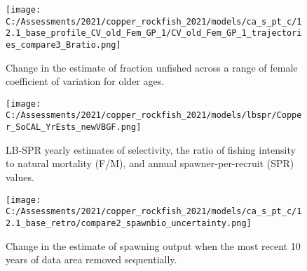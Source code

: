 \documentclass[11pt,
  english,
  a4paper,
]{article}
\begin{document}
\tagmcend\tagstructend


\begin{figure}
\centering
\texttt{[image: C:/Assessments/2021/copper\_rockfish\_2021/models/ca\_s\_pt\_c/12.1\_base\_profile\_CV\_old\_Fem\_GP\_1/CV\_old\_Fem\_GP\_1\_trajectories\_compare3\_Bratio.png]}
\caption{Change in the estimate of fraction unfished across a range of female coefficient of variation for older ages.\label{fig:cv-depl}}
\end{figure}

\tagmcend\tagstructend

\clearpage


\begin{figure}
\centering
\texttt{[image: C:/Assessments/2021/copper\_rockfish\_2021/models/lbspr/Copper\_SoCAL\_YrEsts\_newVBGF.png]}
\caption{LB-SPR yearly estimates of selectivity, the ratio of fishing intensity to natural mortality (F/M), and annual spawner-per-recruit (SPR) values.\label{fig:lbspr}}
\end{figure}

\tagmcend\tagstructend

\newpage


\begin{figure}
\centering
\texttt{[image: C:/Assessments/2021/copper\_rockfish\_2021/models/ca\_s\_pt\_c/12.1\_base\_retro/compare2\_spawnbio\_uncertainty.png]}
\caption{Change in the estimate of spawning output when the most recent 10 years of data area removed sequentially.\label{fig:retro-ssb}}
\end{figure}

\tagmcend\tagstructend

\end{document}
